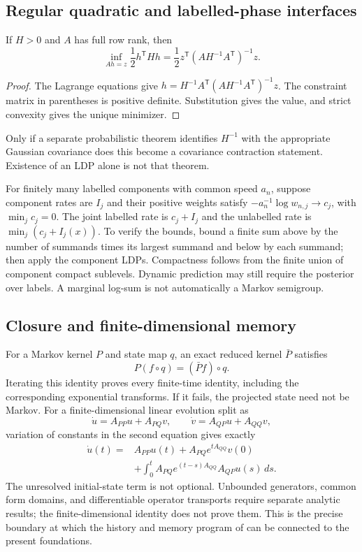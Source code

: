 \subsection{Regular quadratic and labelled-phase interfaces}
\begin{proposition}\label{prop:quadratic}
If $H>0$ and $A$ has full row rank, then
\[
 \inf_{Ah=z}\frac12h^{\mathsf T}Hh
 =\frac12z^{\mathsf T}(AH^{-1}A^{\mathsf T})^{-1}z.
\]
\end{proposition}
\begin{proof}
The Lagrange equations give
$h=H^{-1}A^{\mathsf T}(AH^{-1}A^{\mathsf T})^{-1}z$.
The constraint matrix in parentheses is positive definite. Substitution
gives the value, and strict convexity gives the unique minimizer.
\end{proof}

Only if a separate probabilistic theorem identifies $H^{-1}$ with the
appropriate Gaussian covariance does this become a covariance contraction
statement. Existence of an LDP alone is not that theorem.

For finitely many labelled components with common speed $a_n$, suppose
component rates are $I_j$ and their positive weights satisfy
$-a_n^{-1}\log w_{n,j}\to c_j$, with $\min_jc_j=0$. The joint
labelled rate is $c_j+I_j$ and the unlabelled rate is
$\min_j(c_j+I_j(x))$. To verify the bounds, bound a finite sum above by
the number of summands times its largest summand and below by each summand;
then apply the component LDPs. Compactness follows from the finite union
of component compact sublevels. Dynamic prediction may still require the
posterior over labels. A marginal log-sum is not automatically a Markov
semigroup.

\subsection{Closure and finite-dimensional memory}
For a Markov kernel $P$ and state map $q$, an exact reduced kernel $\bar P$
satisfies
\[
 P(f\circ q)=(\bar Pf)\circ q.
\]
Iterating this identity proves every finite-time identity, including the
corresponding exponential transforms. If it fails, the projected state need
not be Markov.
For a finite-dimensional linear evolution split as
\[
 \dot u=A_{PP}u+A_{PQ}v,\qquad
 \dot v=A_{QP}u+A_{QQ}v,
\]
variation of constants in the second equation gives exactly
\begin{equation}\label{eq:memory}
 \begin{split}
 \dot u(t)={}&A_{PP}u(t)+A_{PQ}e^{tA_{QQ}}v(0)\\
 &+\int_0^t A_{PQ}e^{(t-s)A_{QQ}}A_{QP}u(s)\,ds.
 \end{split}
\end{equation}
The unresolved initial-state term is not optional. Unbounded generators,
common form domains, and differentiable operator transports require
separate analytic results; the finite-dimensional identity does not prove
them. This is the precise boundary at which the history and memory
program of \cite{QiC2} can be connected to the present foundations.
